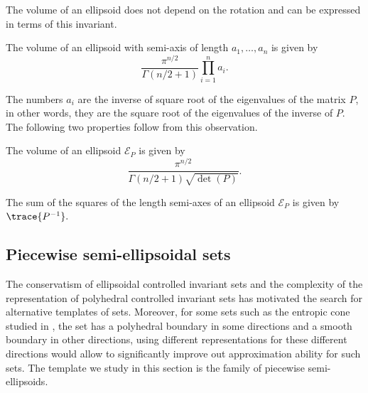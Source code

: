 \documentclass[11pt,twoside,a4paper,openright]{uclouvain-thesis}
\begin{document}
The volume of an ellipsoid does not depend on the rotation
and can be expressed in terms of this invariant.
\begin{myprop}
  The volume of an ellipsoid with semi-axis of length
  $a_1, \ldots, a_n$ is given by
  \[ \frac{\pi^{n/2}}{\Gamma(n/2 + 1)} \prod_{i=1}^n a_i. \]
\end{myprop}

The numbers $a_i$ are the inverse of square root of the eigenvalues of the matrix $P$,
in other words, they are the square root of the eigenvalues
of the inverse of $P$.
The following two properties follow from this observation.

\begin{myprop}
  \label{prop:detell}
  The volume of an ellipsoid $\mathcal{E}_P$ is given by
  \[ \frac{\pi^{n/2}}{\Gamma(n/2 + 1) \sqrt{\det(P)}}. \]
\end{myprop}

\begin{myprop}
  \label{prop:trell}
  The sum of the squares of the length semi-axes of an ellipsoid $\mathcal{E}_P$ is given by
  \( \trace{P^{-1}}. \)
\end{myprop}

\subsection{Piecewise semi-ellipsoidal sets}
\label{sec:pieceell}

The conservatism of ellipsoidal controlled invariant sets and the complexity of the representation
of polyhedral controlled invariant sets has motivated the search for alternative templates of sets.
Moreover, for some sets such as the entropic cone studied in ,
the set has a polyhedral boundary in some directions and a smooth boundary in other
directions, using different representations for these different directions would allow to
significantly improve out approximation ability for such sets.
The template we study in this section is the family of piecewise semi-ellipsoids.
\end{document}
